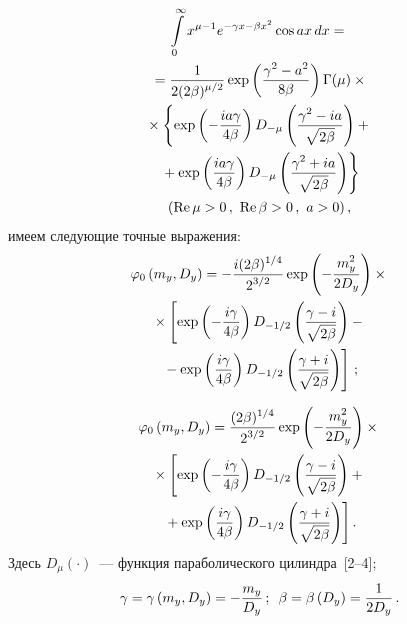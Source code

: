 \begin{multicols}{2}
{\noindent
\begin{multline*}
\iii_0^\infty x^{\mu-1} e^{-\gamma x-\beta x^2} \cos  ax \,dx = {}\\
{}=
\fr{1}{2(2\beta)^{\mu/2}}\exp\left(
\fr{\gamma^2-a^2}{8\beta}\right) \Gamma(\mu) \times{}\\
{}\times\left\{ \exp\left(
-\fr{ia\gamma}{4\beta}\right) D_{-\mu} \left(
\fr{\gamma^2-ia}{\sqrt{2\beta}}\right)+{}\right.\\
\left.{}+\exp\left(
\fr{ia\gamma}{4\beta}\right) D_{-\mu} \left(
\fr{\gamma^2+ia}{\sqrt{2\beta}}\right)\right\}
      \\
       (\mathrm{Re}\, \mu >0\,,\ \mathrm{Re}\, \beta>0\,,\  a>0)\,,
      \end{multline*}
имеем следующие точные выражения:
\begin{multline*}
\varphi_0 \left(m_y, D_y\right)= -
\fr{i(2\beta)^{1/4}}{2^{3/2}}\exp \left(-\fr{m_y^2}{2D_y}\right)\times{}\\
{}\times\left[ \exp\left( -\fr{i\gamma}{4\beta}\right)D_{-1/2} \left(
\fr{\gamma-i}{\sqrt{2\beta}}\right)-{}\right.\\
\left.{}- \exp\left( 
\fr{i\gamma}{4\beta}\right)D_{-1/2} \left(
\fr{\gamma+i}{\sqrt{2\beta}}\right)\right]\,;
\end{multline*}

\vspace*{-10pt}

\noindent
\begin{multline*}
\varphi_0 \left(m_y, D_y\right)= 
\fr{(2\beta)^{1/4}}{2^{3/2}}\exp \left(-\fr{m_y^2}{2D_y}\right)\times{}\\
{}\times\left[ \exp\left( -\fr{i\gamma}{4\beta}\right)D_{-1/2} \left(
\fr{\gamma-i}{\sqrt{2\beta}}\right)+{}\right.\\
\left.{}+ \exp\left( 
\fr{i\gamma}{4\beta}\right)D_{-1/2} \left(
\fr{\gamma+i}{\sqrt{2\beta}}\right)\right].
\end{multline*}
Здесь $D_\mu (\cdot )$~--- функция параболического цилиндра~[2--4];
    $$
    \gamma =\gamma \left(m_y, D_y\right) =- \fr{m_y}{D_y}\,;\enskip 
    \beta =\beta \left(D_y\right)= \fr{1}{2 D_y}\,.
    $$


}
\end{multicols}
